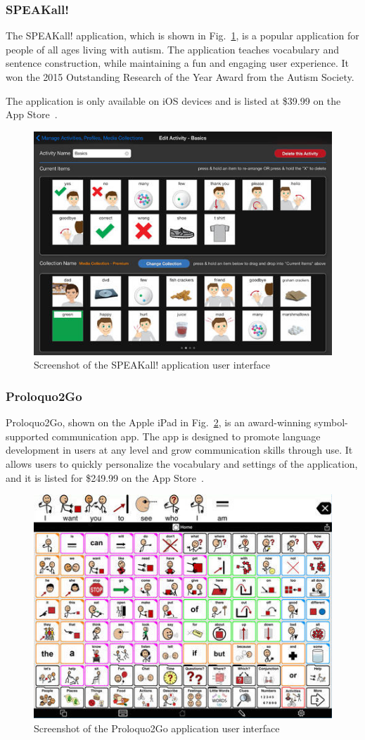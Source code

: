 \subsubsection{SPEAKall!}
The SPEAKall! application, which is shown in Fig.~\ref{fig:speakAll}, is a popular application for people of all ages living with autism. The application teaches vocabulary and sentence construction, while maintaining a fun and engaging user experience. It won the 2015 Outstanding Research of the Year Award from the Autism Society.

The application is only available on iOS devices and is listed at \$39.99 on the App Store~\cite{speakAll}. 

\begin{figure}[!htb]
\centering
\includegraphics[width=.7\textwidth]{speakAll.png}
\caption{\label{fig:speakAll}Screenshot of the SPEAKall! application user interface}
\end{figure}

\subsubsection{Proloquo2Go}
Proloquo2Go, shown on the Apple iPad in Fig.~\ref{fig:proloquo2go}, is an award-winning symbol-supported communication app. The app is designed to promote language development in users at any level and grow communication skills through use. It allows users to quickly personalize the vocabulary and settings of the application, and it is listed for \$249.99 on the App Store~\cite{proloquo}. 

\begin{figure}[!htb]
\centering
\includegraphics[width=.6\textwidth]{proloquo2go.png}
\caption{\label{fig:proloquo2go}Screenshot of the Proloquo2Go application user interface}
\end{figure}